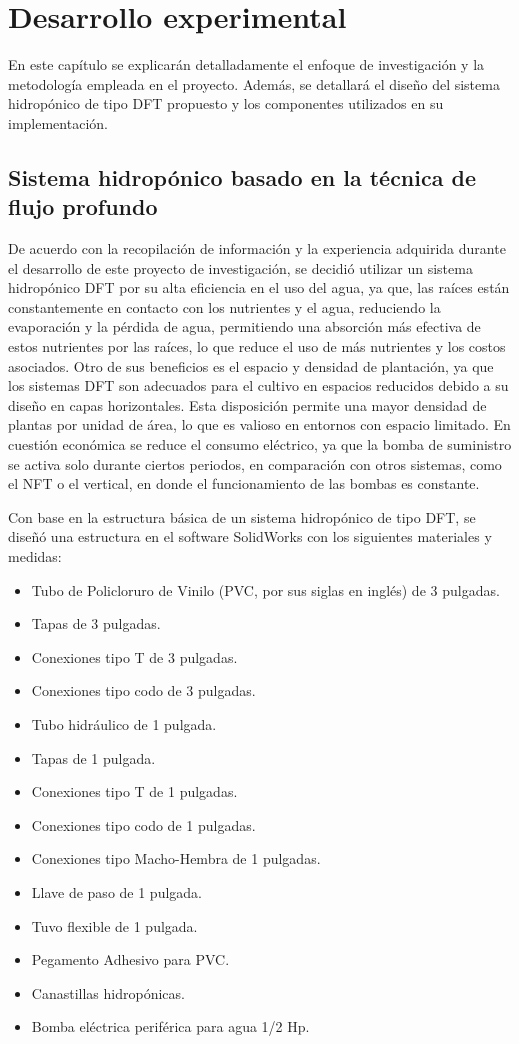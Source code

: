 \chapter{Desarrollo experimental} \label{chap:DesExp}
 En este capítulo se explicarán detalladamente el enfoque de investigación y la metodología empleada en el proyecto. Además, se detallará el diseño del sistema hidropónico de tipo DFT propuesto y los componentes utilizados en su implementación.
\section{Sistema hidropónico basado en la técnica de flujo profundo}

De acuerdo con la recopilación de información y la experiencia adquirida durante el desarrollo de este proyecto de investigación, se decidió utilizar un sistema hidropónico DFT por su alta eficiencia en el uso del agua, ya que, las raíces están constantemente en contacto con los nutrientes y el agua, reduciendo la evaporación y la pérdida de agua, permitiendo una absorción más efectiva de estos nutrientes por las raíces, lo que reduce el uso de más nutrientes y los costos asociados. Otro de sus beneficios es el espacio y densidad de plantación, ya que los sistemas DFT son adecuados para el cultivo en espacios reducidos debido a su diseño en capas horizontales. Esta disposición permite una mayor densidad de plantas por unidad de área, lo que es valioso en entornos con espacio limitado. En cuestión económica se reduce el consumo eléctrico, ya que la bomba de suministro se activa solo durante ciertos periodos, en comparación con otros sistemas, como el NFT o el vertical, en donde el funcionamiento de las bombas es constante.

Con base en la estructura básica de un sistema hidropónico de tipo DFT, se diseñó una estructura en el software SolidWorks con los siguientes materiales y medidas:
\begin{itemize}
\item Tubo de Policloruro de Vinilo (PVC, por sus siglas en inglés) de 3 pulgadas. 
\item Tapas de 3 pulgadas.
\item Conexiones tipo T de 3 pulgadas.
\item Conexiones tipo codo de 3 pulgadas.
\item Tubo hidráulico de 1 pulgada.
\item Tapas de 1 pulgada.
\item Conexiones tipo T de 1 pulgadas.
\item Conexiones tipo codo de 1 pulgadas.
\item Conexiones tipo Macho-Hembra de 1 pulgadas.
\item Llave de paso de 1 pulgada.
\item Tuvo flexible de 1 pulgada.
\item Pegamento Adhesivo para PVC.
\item Canastillas hidropónicas.
\item Bomba eléctrica periférica para agua 1/2 Hp.
\end{itemize}

